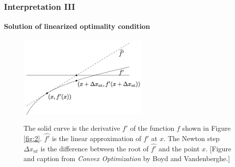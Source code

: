 \documentclass{beamer}
\begin{document}
\begin{frame}
\frametitle{Interpretation III}
\framesubtitle{Solution of linearized optimality condition}
\begin{figure}
\includegraphics[width=2.5in]{linear.png}
\label{fig:3}
\caption{
The solid curve is the derivative $f'$ of the function $f$ shown in Figure
\ref{fig:2}.
$\hat{f'}$ is the linear approximation of $f'$ at $x$. The Newton step
$\Delta x_{nt}$ is the difference between the root of $\hat{f'}$ and the point $x$. [Figure and caption from  \textit{Convex Optimization} by Boyd and Vandenberghe.]
}
\end{figure}
\end{frame}
\end{document}
